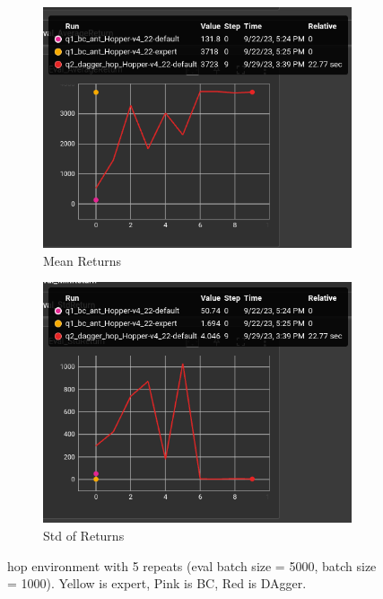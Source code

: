 \documentclass[11pt]{article}
\begin{document}
\begin{figure}[h]
    \centering
    \begin{subfigure}[b]{0.47\textwidth}
        \centering
        \includegraphics[width=\textwidth]{09-29-dag_hop_mean}
        \caption{Mean Returns}
        \label{fig:hop_mean}
    \end{subfigure}
    \hfill
    \begin{subfigure}[b]{0.47\textwidth}
        \centering
        \includegraphics[width=\textwidth]{09-29-dag_hop_std}
        \caption{Std of Returns}
        \label{fig:hop_std}
    \end{subfigure}
    \caption{hop environment with 5 repeats (eval batch size = 5000, batch size = 1000). Yellow is expert, Pink is BC, Red is DAgger.}
    \label{fig:hop_dag}
\end{figure}
\end{document}
